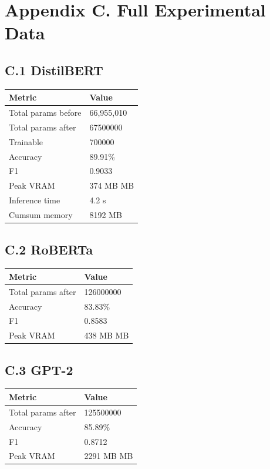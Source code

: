 \section{Appendix C. Full Experimental Data}

\subsection{C.1 DistilBERT}

\begin{table}[H]
\centering
\small
\begin{tabular}{ll}
\toprule
\textbf{Metric} & \textbf{Value} \\
\midrule
Total params before & 66,955,010 \\
Total params after & 67500000 \\
Trainable & 700000 \\
Accuracy & 89.91\% \\
F1 & 0.9033 \\
Peak VRAM & 374 MB MB \\
Inference time & 4.2 s \\
Cumsum memory & 8192 MB \\
\bottomrule
\end{tabular}
\end{table}

\subsection{C.2 RoBERTa}

\begin{table}[H]
\centering
\small
\begin{tabular}{ll}
\toprule
\textbf{Metric} & \textbf{Value} \\
\midrule
Total params after & 126000000 \\
Accuracy & 83.83\% \\
F1 & 0.8583 \\
Peak VRAM & 438 MB MB \\
\bottomrule
\end{tabular}
\end{table}

\subsection{C.3 GPT-2}

\begin{table}[H]
\centering
\small
\begin{tabular}{ll}
\toprule
\textbf{Metric} & \textbf{Value} \\
\midrule
Total params after & 125500000 \\
Accuracy & 85.89\% \\
F1 & 0.8712 \\
Peak VRAM & 2291 MB MB \\
\bottomrule
\end{tabular}
\end{table}

